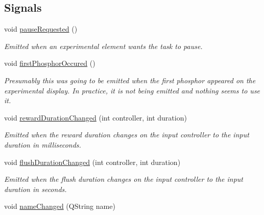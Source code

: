 \subsection*{Signals}
\begin{DoxyCompactItemize}
\item 
void \hyperlink{class_picto_1_1_engine_1_1_picto_engine_ae1ce1dd892f6c79d5e32d5d2397f6d7e}{pause\-Requested} ()
\begin{DoxyCompactList}\small\item\em Emitted when an experimental element wants the task to pause. \end{DoxyCompactList}\item 
\hypertarget{class_picto_1_1_engine_1_1_picto_engine_ae5c2c7ecb9b889e6ee4d69c507ea1bec}{void \hyperlink{class_picto_1_1_engine_1_1_picto_engine_ae5c2c7ecb9b889e6ee4d69c507ea1bec}{first\-Phosphor\-Occured} ()}\label{class_picto_1_1_engine_1_1_picto_engine_ae5c2c7ecb9b889e6ee4d69c507ea1bec}

\begin{DoxyCompactList}\small\item\em Presumably this was going to be emitted when the first phosphor appeared on the experimental display. In practice, it is not being emitted and nothing seems to use it. \end{DoxyCompactList}\item 
\hypertarget{class_picto_1_1_engine_1_1_picto_engine_abdf7ee9c2ba181f88e486d7c97c72836}{void \hyperlink{class_picto_1_1_engine_1_1_picto_engine_abdf7ee9c2ba181f88e486d7c97c72836}{reward\-Duration\-Changed} (int controller, int duration)}\label{class_picto_1_1_engine_1_1_picto_engine_abdf7ee9c2ba181f88e486d7c97c72836}

\begin{DoxyCompactList}\small\item\em Emitted when the reward duration changes on the input controller to the input duration in milliseconds. \end{DoxyCompactList}\item 
\hypertarget{class_picto_1_1_engine_1_1_picto_engine_a7d62c085c399ce29e72657b0b5a65378}{void \hyperlink{class_picto_1_1_engine_1_1_picto_engine_a7d62c085c399ce29e72657b0b5a65378}{flush\-Duration\-Changed} (int controller, int duration)}\label{class_picto_1_1_engine_1_1_picto_engine_a7d62c085c399ce29e72657b0b5a65378}

\begin{DoxyCompactList}\small\item\em Emitted when the flush duration changes on the input controller to the input duration in seconds. \end{DoxyCompactList}\item 
\hypertarget{class_picto_1_1_engine_1_1_picto_engine_ab184ce0fca04d256f3feb2600bb1cc48}{void \hyperlink{class_picto_1_1_engine_1_1_picto_engine_ab184ce0fca04d256f3feb2600bb1cc48}{name\-Changed} (Q\-String name)}\label{class_picto_1_1_engine_1_1_picto_engine_ab184ce0fca04d256f3feb2600bb1cc48}


\end{DoxyCompactItemize}
